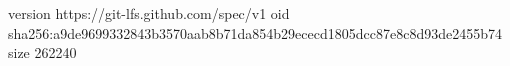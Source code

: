 version https://git-lfs.github.com/spec/v1
oid sha256:a9de9699332843b3570aab8b71da854b29ececd1805dcc87e8c8d93de2455b74
size 262240
